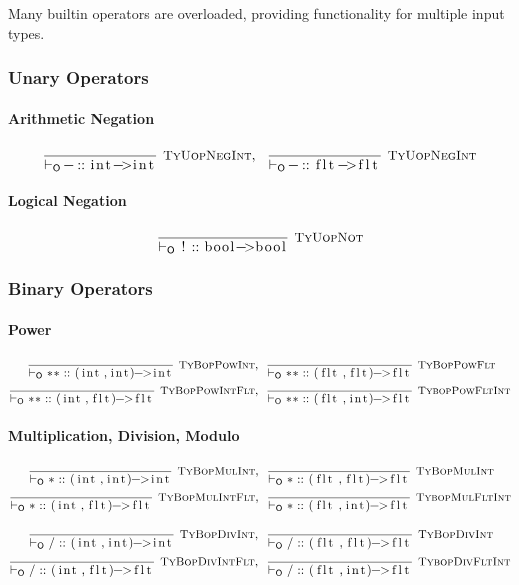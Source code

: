 \documentclass{article}
\newcommand{\code}[1]{\lstinline[columns=fixed]{#1}}
\newcommand{\drmrule}[5]{\frac{#1}{#2\vdash_{\mathsf{#3}}#4}\textsc{\ \small{#5}}}
\newcommand{\mc}[1]{\textnormal{\code{#1}}}
\newcommand{\subsubsubsection}{\paragraph}
\begin{document}
			Many builtin operators are overloaded, providing functionality for multiple input types.
			
			\subsubsection{Unary Operators}
			
				\subsubsubsection{Arithmetic Negation}
				
					\begin{align*}
						\drmrule{}{}{O}{\mc{-} :: \mc{int->int}}{TyUopNegInt},\ \ 
						\drmrule{}{}{O}{\mc{-} :: \mc{flt->flt}}{TyUopNegInt}
					\end{align*}
				
				\subsubsubsection{Logical Negation}

					\begin{align*}
						\drmrule{}{}{O}{\mc{!} :: \mc{bool->bool}}{TyUopNot}
					\end{align*}
			
			\subsubsection{Binary Operators}
			
				\subsubsubsection{Power}
				
					\begin{align*}
						\drmrule{}{}{O}{\mc{**} :: \mc{(int,int)->int}}{TyBopPowInt},\ \ &
						\drmrule{}{}{O}{\mc{**} :: \mc{(flt,flt)->flt}}{TyBopPowFlt}\\
						\drmrule{}{}{O}{\mc{**} :: \mc{(int,flt)->flt}}{TyBopPowIntFlt},\ \ &
						\drmrule{}{}{O}{\mc{**} :: \mc{(flt,int)->flt}}{TybopPowFltInt}
					\end{align*}
				
				\subsubsubsection{Multiplication, Division, Modulo}
				
					\begin{align*}
						\drmrule{}{}{O}{\mc{*} :: \mc{(int,int)->int}}{TyBopMulInt},\ \ &
						\drmrule{}{}{O}{\mc{*} :: \mc{(flt,flt)->flt}}{TyBopMulInt}\\
						\drmrule{}{}{O}{\mc{*} :: \mc{(int,flt)->flt}}{TyBopMulIntFlt},\ \ &
						\drmrule{}{}{O}{\mc{*} :: \mc{(flt,int)->flt}}{TybopMulFltInt}
					\end{align*}
					
					\begin{align*}
						\drmrule{}{}{O}{\mc{/} :: \mc{(int,int)->int}}{TyBopDivInt},\ \ &
						\drmrule{}{}{O}{\mc{/} :: \mc{(flt,flt)->flt}}{TyBopDivInt}\\
						\drmrule{}{}{O}{\mc{/} :: \mc{(int,flt)->flt}}{TyBopDivIntFlt},\ \ &
						\drmrule{}{}{O}{\mc{/} :: \mc{(flt,int)->flt}}{TybopDivFltInt}
					\end{align*}
					
\end{document}
